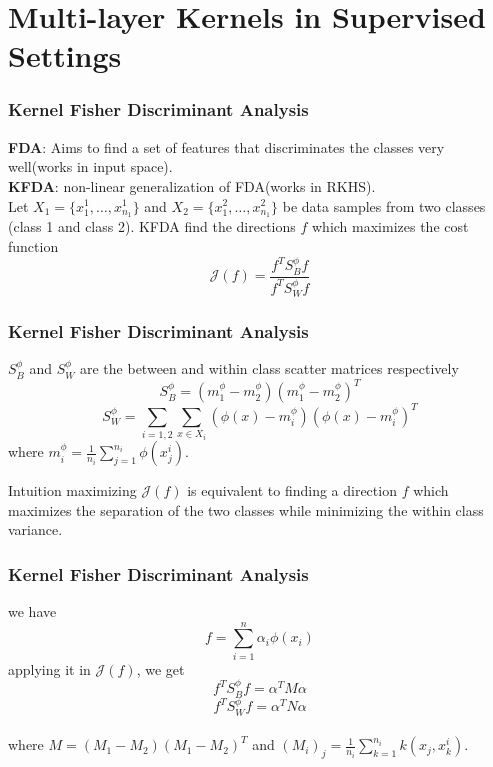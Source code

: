 \documentclass[a4paper,compress,svgnames]{beamer}
\begin{document}
\section{Multi-layer Kernels in Supervised Settings}
\begin{frame}
\frametitle{Kernel Fisher Discriminant Analysis}
\textbf{FDA}: Aims to find a set of features that discriminates the classes very well(works in input space).\\
\textbf{KFDA}: non-linear generalization of FDA(works in RKHS).\\
\vspace{0.3in}
Let $X_1 = \{x_1^1, \ldots, x_{n_1}^1 \}$ and $X_2 = \{x_1^2, \ldots, x_{n_1}^2 \}$ be data samples from two classes (class 1 and class 2). KFDA find the directions $f$ which maximizes the cost function
\begin{equation*}
\mathcal{J}(f) = \frac{f^TS_B^{\phi}f}{f^TS_W^{\phi}f} 
\label{4_jw}
\end{equation*}
\end{frame}


\begin{frame}
\frametitle{Kernel Fisher Discriminant Analysis}
$S_B^{\phi}$ and $S_W^{\phi}$ are the between and within class scatter matrices respectively
\[ S_B^{\phi} = (m_1^{\phi} - m_2^{\phi})(m_1^{\phi} - m_2^{\phi})^T \]
\[ S_W^{\phi} = \sum_{i=1,2}\sum_{x \in X_i} (\phi(x)-m_i^{\phi})(\phi(x)-m_i^{\phi})^T  \]
where $m_i^{\phi} = \frac{1}{n_i} \sum_{j=1}^{n_i} \phi(x_j^i)$.\\
\vspace{0.2in}
\begin{block}{Intuition}
maximizing $\mathcal{J}(f)$ is equivalent to finding a direction $f$ which maximizes the separation of the two classes while minimizing the within class variance.
\end{block}
\end{frame}

\begin{frame}
\frametitle{Kernel Fisher Discriminant Analysis}
we have
\begin{equation*}
f = \sum_{i=1}^n \alpha_i \phi(x_i)
\end{equation*}
applying it in $\mathcal{J}(f)$, we get
\[ f^T S_B^{\phi} f = \alpha^T M \alpha \]
\[ f^T S_W^{\phi} f = \alpha^T N \alpha \] \\
\vspace{0.2in}
where $M = (M_1-M_2)(M_1-M_2)^T$ and $(M_i)_j = \frac{1}{n_i} \sum_{k=1}^{n_i}  k(x_j, x_k^i)$.
\end{frame}
\end{document}

